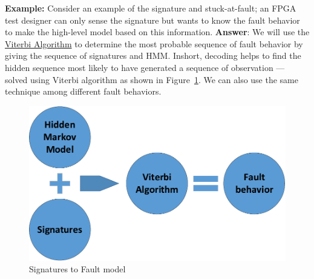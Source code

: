  
\textbf{Example:} Consider an example of the signature and stuck-at-fault; an FPGA test designer can only sense the signature but wants to know the fault behavior to make the high-level model based on this information.
\textbf{Answer}: We will use the \underline{Viterbi Algorithm} to determine the most probable sequence of fault behavior by giving the sequence of signatures and HMM. Inshort, decoding helps to find the hidden sequence most likely to have generated a sequence of observation --- solved using Viterbi algorithm as shown in Figure~\ref{fig:HMMsig-Vit}. We can also use the same technique among different fault behaviors.
\begin{figure}[tb!]
 \centering
  \captionsetup{justification=centering}    
   \includegraphics[scale=0.8]{Figures/HMM-plus-viterbi.pdf}
   \caption{Signatures to Fault model}
\label{fig:HMMsig-Vit}
\end{figure}
